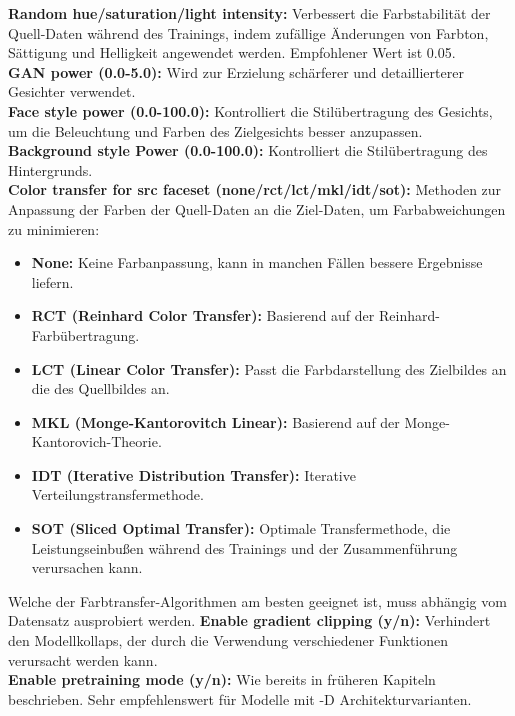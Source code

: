 \textbf{Random hue/saturation/light intensity:} Verbessert die Farbstabilität der Quell-Daten während des Trainings, indem zufällige Änderungen von Farbton, Sättigung und Helligkeit angewendet werden.
Empfohlener Wert ist 0.05.\\
\textbf{GAN power (0.0-5.0):} Wird zur Erzielung schärferer und detaillierterer Gesichter verwendet.\\
\textbf{Face style power (0.0-100.0):} Kontrolliert die Stilübertragung des Gesichts, um die Beleuchtung und Farben des Zielgesichts besser anzupassen.\\
\textbf{Background style Power (0.0-100.0):} Kontrolliert die Stilübertragung des Hintergrunds.\\
\textbf{Color transfer for src faceset (none/rct/lct/mkl/idt/sot):} Methoden zur Anpassung der Farben der Quell-Daten an die Ziel-Daten, um Farbabweichungen zu minimieren:
\begin{itemize}
    \item \textbf{None:} Keine Farbanpassung, kann in manchen Fällen bessere Ergebnisse liefern.
    \item \textbf{RCT (Reinhard Color Transfer):} Basierend auf der Reinhard-Farbübertragung.
    \item \textbf{LCT (Linear Color Transfer):} Passt die Farbdarstellung des Zielbildes an die des Quellbildes an.
    \item \textbf{MKL (Monge-Kantorovitch Linear):} Basierend auf der Monge-Kantorovich-Theorie.
    \item \textbf{IDT (Iterative Distribution Transfer):} Iterative Verteilungstransfermethode.
    \item \textbf{SOT (Sliced Optimal Transfer):} Optimale Transfermethode, die Leistungseinbußen während des Trainings und der Zusammenführung verursachen kann.
\end{itemize}
Welche der Farbtransfer-Algorithmen am besten geeignet ist, muss abhängig vom Datensatz ausprobiert werden.
\textbf{Enable gradient clipping (y/n):} Verhindert den Modellkollaps, der durch die Verwendung verschiedener Funktionen verursacht werden kann.\\
\textbf{Enable pretraining mode (y/n):} Wie bereits in früheren Kapiteln beschrieben.
Sehr empfehlenswert für Modelle mit -D Architekturvarianten.\\[0.5cm]

